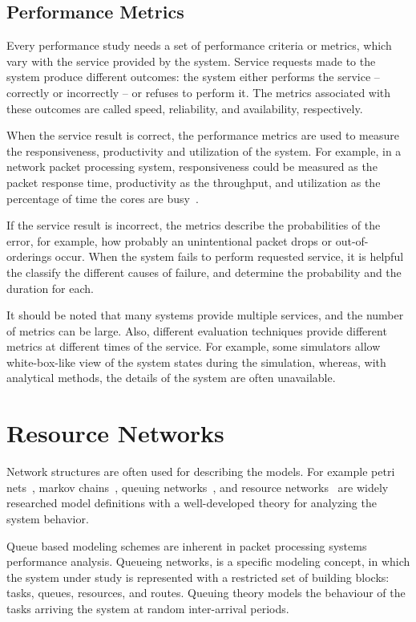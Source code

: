 \subsection{Performance Metrics}
Every performance study needs a set of performance criteria or metrics, which vary with the service provided by the system. Service requests made to the system produce different outcomes: the system either performs the service -- correctly or incorrectly -- or refuses to perform it. The metrics associated with these outcomes are called speed, reliability, and availability, respectively.~\cite{jain:1991:AOCSPA}

When the service result is correct, the performance metrics are used to measure the responsiveness, productivity and utilization of the system. For example, in a network packet processing system, responsiveness could be measured as the packet response time, productivity as the throughput, and utilization as the percentage of time the cores are busy~\cite{cavium:2010:fundamentals}.~\cite{jain:1991:AOCSPA}

If the service result is incorrect, the metrics describe the probabilities of the error, for example, how probably an unintentional packet drops or out-of-orderings occur. When the system fails to perform requested service, it is helpful the classify the different causes of failure, and determine the probability and the duration for each.~\cite{jain:1991:AOCSPA}

It should be noted that many systems provide multiple services, and the number of metrics can be large. Also, different evaluation techniques provide different metrics at different times of the service. For example, some simulators allow white-box-like view of the system states during the simulation, whereas, with analytical methods, the details of the system are often unavailable.~\cite{jain:1991:AOCSPA}

\section{Resource Networks}
Network structures are often used for describing the models. For example petri nets~\cite{Peterson:1981:Petri}, markov chains~\cite{Bolch:2006:Queueing}, queuing networks~\cite{Bolch:2006:Queueing}, and resource networks~\cite{Menasce:1994:CPP} are widely researched model definitions with a well-developed theory for analyzing the system behavior.

Queue based modeling schemes are inherent in packet processing systems performance analysis. Queueing networks, is a specific modeling concept, in which the system under study is represented with a restricted set of building blocks: tasks, queues, resources, and routes. Queuing theory models the behaviour of the tasks arriving the system at random inter-arrival periods.~\cite{Bolch:2006:Queueing}

